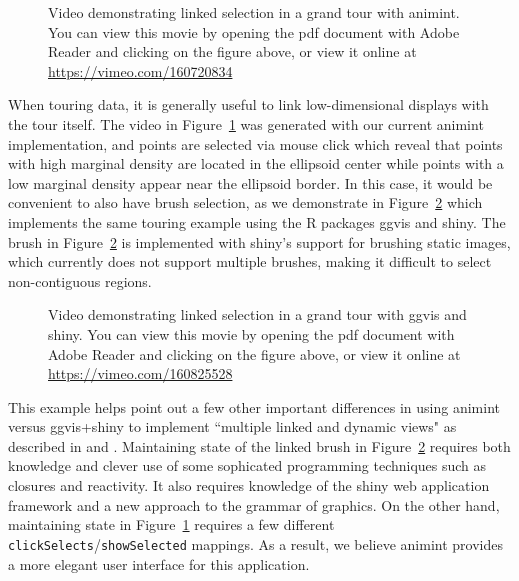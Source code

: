 \documentclass[12pt]{article}\usepackage[]{graphicx}\usepackage[]{color}
\begin{document}
\begin{figure}[htp]
	\centerline{}
	\label{fig:tour}
	\caption{Video demonstrating linked selection in a grand tour with animint. You can view this movie by opening the pdf document with Adobe Reader and clicking on the figure above, or view it online at \url{https://vimeo.com/160720834}}
\end{figure}

When touring data, it is generally useful to link low-dimensional displays with
the tour itself. The video in Figure~\ref{fig:tour} was generated with our
current animint implementation, and points are selected via mouse click which
reveal that points with high marginal density are located in the
ellipsoid center while points with a low marginal density appear near the 
ellipsoid border. In this case, it would be convenient to also have brush 
selection, as we demonstrate in
Figure~\ref{fig:tourbrush} which implements the same touring example using the
R packages ggvis and shiny. The brush in Figure~\ref{fig:tourbrush} is 
implemented with shiny's support for brushing static images, which currently 
does not support multiple brushes, making it difficult to select
non-contiguous regions. 

\begin{figure}[htp]
	\centerline{}
	\label{fig:tourbrush}
	\caption{Video demonstrating linked selection in a grand tour with ggvis and shiny. You can view this movie by opening the pdf document with Adobe Reader and clicking on the figure above, or view it online at \url{https://vimeo.com/160825528}}
\end{figure}

This example helps point out a few other important differences in using 
animint versus ggvis+shiny to implement ``multiple linked and dynamic views" 
as described in \citep{Ahlberg:1991} and \citep{Buja:1991vh}. 
Maintaining state of the linked brush in Figure~\ref{fig:tourbrush} 
requires both knowledge and clever use of some sophicated programming 
techniques such as closures and reactivity. 
It also requires knowledge of the shiny web application framework and 
a new approach to the grammar of graphics. 
On the other hand, maintaining state in Figure~\ref{fig:tour} requires
a few different \texttt{clickSelects}/\texttt{showSelected} mappings. As a
result, we believe animint provides a more elegant user interface for 
this application.
\end{document}
